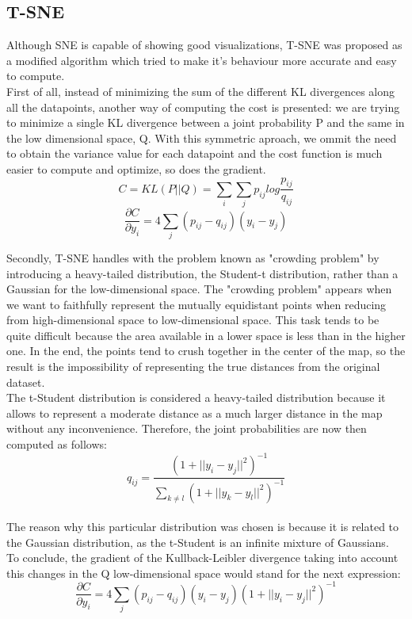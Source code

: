\documentclass[a4paper,11pt,spanish]{report}
\begin{document}
\subsection{T-SNE}
\label{ssec:tsne}
Although SNE is capable of showing good visualizations, T-SNE was proposed as a modified algorithm which tried to make it's behaviour more accurate and easy to compute.\\
First of all, instead of minimizing the sum of the different KL divergences along all the datapoints, another way of computing the cost is presented: we are trying to minimize a single KL divergence between a joint probability P and the same in the low dimensional space, Q. With this symmetric aproach, we ommit the need to obtain the variance value for each datapoint and the cost function is much easier to compute and optimize, so does the gradient.
$$ C = KL(P||Q) = \sum\limits_{i} \sum\limits_{j} p_{ij} log \frac{p_{ij}}{q_{ij}}$$
$$ \frac{\partial C}{\partial y_{i}} = 4 \sum\limits_j (p_{ij} - q_{ij}) (y_{i} - y_{j}) $$

Secondly, T-SNE handles with the problem known as "crowding problem" by introducing a heavy-tailed distribution, the Student-t distribution, rather than a Gaussian for the low-dimensional space. The "crowding problem" appears when we want to faithfully represent the mutually equidistant points when reducing from high-dimensional space to low-dimensional space. This task tends to be quite difficult because the area available in a lower space is less than in the higher one. In the end, the points tend to crush together in the center of the map, so the result is the impossibility of representing the true distances from the original dataset.\\
The t-Student distribution is considered a heavy-tailed distribution because it allows to represent a moderate distance as a much larger distance in the map without any inconvenience.
Therefore, the joint probabilities are now then computed as follows:\\
$$ q_{ij} = \frac{(1+ ||y_{i}-y_{j}||^2)^{-1}} {\sum\limits_{k\neq l} (1+ ||y_{k}-y_{l}||^2)^{-1} }$$\\
The reason why this particular distribution was chosen is because it is related to the Gaussian distribution, as the t-Student is an infinite mixture of Gaussians.\\
To conclude, the gradient of the Kullback-Leibler divergence taking into account this changes in the Q low-dimensional space would stand for the next expression:\\
$$ \frac{\partial C}{\partial y_{i}} = 4 \sum\limits_j (p_{ij} - q_{ij}) (y_{i} - y_{j}) (1+ ||y_{i}-y_{j}||^2)^{-1}$$
\newpage
\end{document}
